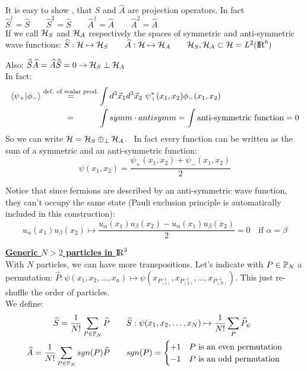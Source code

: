 It is easy to show , that $\widehat S$ and $\widehat A$ are projection operators. In fact $\widehat S^\dag = \widehat S \qquad \widehat S^2 = \widehat S \qquad \widehat A^\dag = \widehat A \qquad \widehat A ^2 = \widehat A$\\
If we call $\mathcal{H}_S$ and $\mathcal{H}_A$ respectively the spaces of symmetric and anti-symmetric wave functions: $\widehat S : \mathcal{H} \mapsto \mathcal{H}_S \qquad \widehat A: \mathcal{H} \mapsto \mathcal{H}_A \qquad \mathcal{H}_S, \mathcal{H}_A \subset \mathcal{H} = L^2({\rm I\!R}^6)$

Also: $\widehat S \widehat A = \widehat A \widehat S = 0 \rightarrow \mathcal{H}_S \perp \mathcal{H}_A$\\
In fact: 
\begin{align*}
    \left\langle \psi_+ \middle| \phi_- \right\rangle \stackrel{\text{def. of scalar prod.}}{=} &\int d^3 \vec x_1 d^3 \vec x_2 \ \psi^*_+ (x_1,x_2) \phi_-(x_1,x_2) \\
    =\qquad \quad  &\int symm \cdot antisymm = \int \text{anti-symmetric function} = 0
\end{align*}
So we can write $\mathcal{H} = \mathcal{H}_S \oplus_\perp \mathcal{H}_A$. \ In fact every function can be written as the sum of a symmetric and an anti-symmetric function:
$$ \psi(x_1, x_2) = \frac{\psi_+(x_1, x_2) + \psi_-(x_1,x_2)}2$$

Notice that since fermions are described by an anti-symmetric wave function, they can't occupy the same state (Pauli exclusion principle is automatically included in this construction):
$$u_\alpha(x_1) u_\beta(x_2) \mapsto \frac{u_\alpha(x_1) u_\beta(x_2) - u_\alpha(x_1) u_\beta(x_2)}2  = 0 \quad \text{if } \alpha = \beta$$

\vspace{10pt}
\underline{\textbf{Generic $N>2$ particles in ${\rm I\!R}^3$}}\\
With $N$ particles, we can have more transpositions. Let's indicate with $P \in \mathbb{P}_N$ a permutation: $\widehat P : \psi(x_1,x_2,\dots,x_n) \mapsto \psi\left(x_{P^{-1}_{(1)}}, x_{P^{-1}_{(2)}}, \dots, x_{P^{-1}_{(N)}}\right)$. This just re-shuffle the order of particles.\\
We define: 
\begin{align*}
    \widehat S = \frac1{N!} \sum_{P\in\mathbb{P}_N} \widehat P \qquad &\widehat S : \psi(x_1,x_2,\dots,x_N) \mapsto \frac1{N!} \sum_P \widehat P_\psi \\
    \widehat A = \frac1{N!} \sum_{P\in\mathbb{P}_N} sgn(P) \widehat P \qquad & sgn(P) = \begin{cases}
        +1 & \text{$P$ is an even permutation} \\
        -1 & \text{$P$ is an odd permutation}
    \end{cases}
\end{align*}

